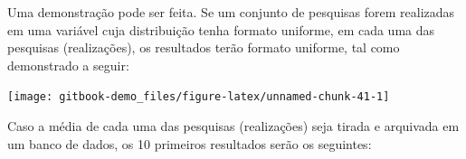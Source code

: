 \documentclass[
]{book}
\newenvironment{Shaded}{\begin{snugshade}}{\end{snugshade}}
\newcommand{\KeywordTok}[1]{\textcolor[rgb]{0.13,0.29,0.53}{\textbf{#1}}}
\newcommand{\NormalTok}[1]{#1}
\newcommand{\OperatorTok}[1]{\textcolor[rgb]{0.81,0.36,0.00}{\textbf{#1}}}
\newcommand{\StringTok}[1]{\textcolor[rgb]{0.31,0.60,0.02}{#1}}
\begin{document}
Uma demonstração pode ser feita. Se um conjunto de pesquisas forem realizadas em uma variável cuja distribuição tenha formato uniforme, em cada uma das pesquisas (realizações), os resultados terão formato uniforme, tal como demonstrado a seguir:

\begin{center}\texttt{[image: gitbook-demo\_files/figure-latex/unnamed-chunk-41-1]} \end{center}

Caso a média de cada uma das pesquisas (realizações) seja tirada e arquivada em um banco de dados, os 10 primeiros resultados serão os seguintes:

\begin{Shaded}
\end{Shaded}
\end{document}
